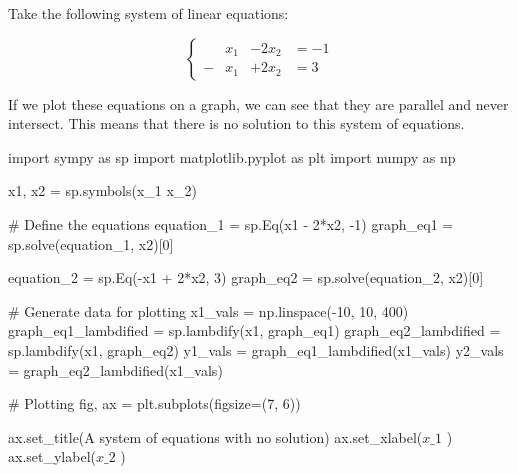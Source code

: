 \documentclass[
  letterpaper,
  DIV=11,
  numbers=noendperiod]{scrreprt}
\newenvironment{Shaded}{\begin{snugshade}}{\end{snugshade}}
\newcommand{\CommentTok}[1]{\textcolor[rgb]{0.37,0.37,0.37}{#1}}
\newcommand{\DecValTok}[1]{\textcolor[rgb]{0.68,0.00,0.00}{#1}}
\newcommand{\ImportTok}[1]{\textcolor[rgb]{0.00,0.46,0.62}{#1}}
\newcommand{\NormalTok}[1]{\textcolor[rgb]{0.00,0.23,0.31}{#1}}
\newcommand{\OperatorTok}[1]{\textcolor[rgb]{0.37,0.37,0.37}{#1}}
\newcommand{\StringTok}[1]{\textcolor[rgb]{0.13,0.47,0.30}{#1}}
\begin{document}
Take the following system of linear equations:

\[
\begin{cases}
&x_1 &- 2x_2 &= -1\\
-&x_1 &+ 2x_2 &= 3
\end{cases}
\]

If we plot these equations on a graph, we can see that they are parallel
and never intersect. This means that there is no solution to this system
of equations.

\begin{Shaded}
\begin{Highlighting}[]
\ImportTok{import}\NormalTok{ sympy }\ImportTok{as}\NormalTok{ sp}
\ImportTok{import}\NormalTok{ matplotlib.pyplot }\ImportTok{as}\NormalTok{ plt}
\ImportTok{import}\NormalTok{ numpy }\ImportTok{as}\NormalTok{ np}

\NormalTok{x1, x2 }\OperatorTok{=}\NormalTok{ sp.symbols(}\StringTok{\textquotesingle{}x\_1 x\_2\textquotesingle{}}\NormalTok{)}

\CommentTok{\# Define the equations}
\NormalTok{equation\_1 }\OperatorTok{=}\NormalTok{ sp.Eq(x1 }\OperatorTok{{-}} \DecValTok{2}\OperatorTok{*}\NormalTok{x2, }\OperatorTok{{-}}\DecValTok{1}\NormalTok{)}
\NormalTok{graph\_eq1 }\OperatorTok{=}\NormalTok{ sp.solve(equation\_1, x2)[}\DecValTok{0}\NormalTok{]}

\NormalTok{equation\_2 }\OperatorTok{=}\NormalTok{ sp.Eq(}\OperatorTok{{-}}\NormalTok{x1 }\OperatorTok{+} \DecValTok{2}\OperatorTok{*}\NormalTok{x2, }\DecValTok{3}\NormalTok{)}
\NormalTok{graph\_eq2 }\OperatorTok{=}\NormalTok{ sp.solve(equation\_2, x2)[}\DecValTok{0}\NormalTok{]}

\CommentTok{\# Generate data for plotting}
\NormalTok{x1\_vals }\OperatorTok{=}\NormalTok{ np.linspace(}\OperatorTok{{-}}\DecValTok{10}\NormalTok{, }\DecValTok{10}\NormalTok{, }\DecValTok{400}\NormalTok{)}
\NormalTok{graph\_eq1\_lambdified }\OperatorTok{=}\NormalTok{ sp.lambdify(x1, graph\_eq1)}
\NormalTok{graph\_eq2\_lambdified }\OperatorTok{=}\NormalTok{ sp.lambdify(x1, graph\_eq2)}
\NormalTok{y1\_vals }\OperatorTok{=}\NormalTok{ graph\_eq1\_lambdified(x1\_vals)}
\NormalTok{y2\_vals }\OperatorTok{=}\NormalTok{ graph\_eq2\_lambdified(x1\_vals)}

\CommentTok{\# Plotting}
\NormalTok{fig, ax }\OperatorTok{=}\NormalTok{ plt.subplots(figsize}\OperatorTok{=}\NormalTok{(}\DecValTok{7}\NormalTok{, }\DecValTok{6}\NormalTok{))}

\NormalTok{ax.set\_title(}\StringTok{\textquotesingle{}A system of equations with no solution\textquotesingle{}}\NormalTok{)}
\NormalTok{ax.set\_xlabel(}\StringTok{\textquotesingle{}$x\_1$                                                                                                                            \textquotesingle{}}\NormalTok{)}
\NormalTok{ax.set\_ylabel(}\StringTok{\textquotesingle{}$x\_2$                                                                                                    \textquotesingle{}}\NormalTok{)}


\end{Highlighting}
\end{Shaded}
\end{document}
